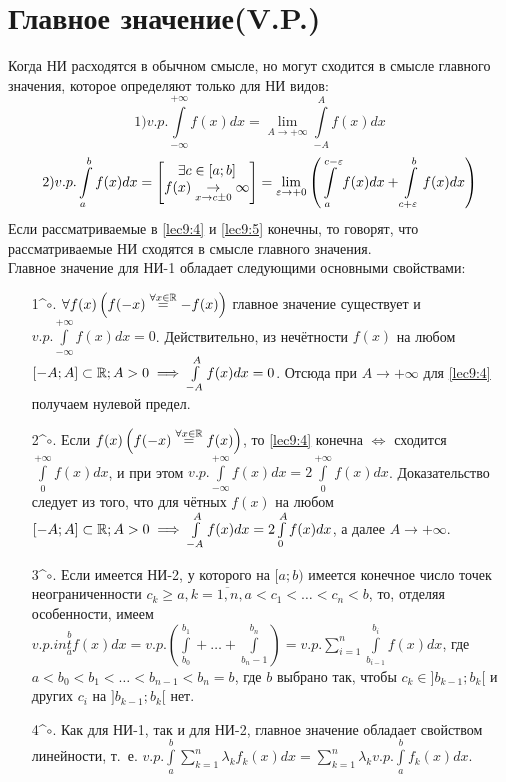 \documentclass[../../main.tex]{subfiles}
\begin{document}
\section{Главное значение(V.P.)}
Когда НИ расходятся в обычном смысле, но могут сходится в смысле главного
значения, которое определяют только для НИ видов:
\begin{equation}
\label{lec9:4} 1) v.p. 
\int\limits_{-\infty}^{+\infty} f(x) dx = 
\lim\limits_{A \to +\infty} \int\limits_{-A}^A f(x)dx
\end{equation}
\begin{equation}
\label{lec9:5} 2) v.p.
\int\limits_a^b f(x) dx = \begin{bmatrix}
	\exists c \in \left[a; b\right]\\
	f(x) \underset{x \to c \pm 0}{\to} \infty
\end{bmatrix} =
\lim\limits_{\varepsilon \to +0} \left(
\int\limits_a^{c - \varepsilon} f(x) dx + 
\int\limits_{c + \varepsilon}^b f(x) dx
\right)
\end{equation}
Если рассматриваемые в \eqref{lec9:4} и \eqref{lec9:5} конечны, то
говорят, что рассматриваемые НИ сходятся в смысле главного значения.\\
Главное значение для НИ-1 обладает следующими основными свойствами:\\
\begin{enumerate}
\item[1^$\circ$.] 
$ \forall f(x) \left(f(-x) \stackrel{\forall x \in \mathbb{R}}{=} -f(x) \right) $
главное значение существует и $ v.p. \int\limits_{-\infty}^{+\infty}f(x)dx=0$.
Действительно, из нечётности $ f(x) $ на любом $ [-A; A] \subset \mathbb{R}; A > 0 
\implies \int\limits_{-A}^A f(x) dx = 0$. Отсюда при $ A \to +\infty $ для
\eqref{lec9:4} получаем нулевой предел.
\item[2^$\circ$.]
Если $ f(x) \left(f(-x) \stackrel{\forall x \in \mathbb{R}}{=} f(x) \right) $, то
\eqref{lec9:4} конечна $ \iff $ сходится $ \int\limits_0^{+\infty}f(x)dx $, и 
при этом $ v.p. \int\limits_{-\infty}^{+\infty} f(x) dx = 
2\int\limits_0^{+\infty} f(x) dx$. Доказательство следует из того, что для
чётных $ f(x) $ на любом $ [-A; A] \subset \mathbb{R}; A > 0 
\implies \int\limits_{-A}^A f(x) dx = 2\int\limits_0^A f(x) dx$, а далее 
$ A \to +\infty $.
\item[3^$\circ$.]
Если имеется НИ-2, у которого на $ [a; b) $ имеется конечное число точек
неограниченности $ c_k \geq a, k = \overline{1,n}, a < c_1 < \dots <
c_n < b $, то, отделяя особенности, имеем $ v.p. int\limits_a^b f(x) dx = 
v.p. \left(\int\limits_{b_0}^{b_1} + \dots + \int\limits_{b_n - 1}^{b_n}
\right) = v.p. \sum\limits_{i = 1}^n \int\limits_{b_{i - 1}}^{b_i} f(x)dx $,
где $ a < b_0 < b_1 < \dots < b_{n - 1} < b_n = b $, где $ b $ выбрано так, 
чтобы $ c_k \in ]b_{k - 1}; b_k[ $ и других $ c_i $ на $ ]b_{k - 1}; b_k[ $ нет.
\item[4^$\circ$.]
Как для НИ-1, так и для НИ-2, главное значение обладает свойством линейности,
т.~е. $ v.p. \int\limits_a^b \sum\limits_{k = 1}^n \lambda_kf_k(x)dx =
\sum\limits_{k = 1}^n \lambda_k v.p. \int\limits_a^b f_k(x)dx$.
\end{enumerate}
\end{document}
